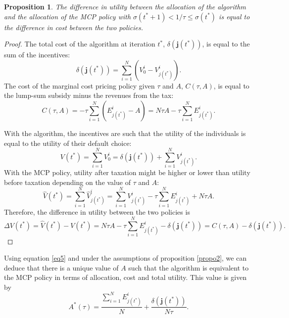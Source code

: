 \documentclass[empty, english]{javaudin}
\newtheorem{propo}{Proposition}
\begin{document}
\begin{propo}
	The difference in utility between the allocation of the algorithm and the allocation of the MCP policy with $\sigma(t^{*}+1) < 1 / \tau \leq \sigma(t^{*})$ is equal to the difference in cost between the two policies.
	\label{propo3}
\end{propo}

\begin{proof}
	
The total cost of the algorithm at iteration $t^{*}$, $\delta(\mathbf{j}(t^{*}))$, is equal to the sum of the incentives:
\begin{equation}
	\delta(\mathbf{j}(t^{*})) = \sum^{N}_{i=1} (V^i_0 - V^i_{j(t^{*})}).
\end{equation}
The cost of the marginal cost pricing policy given $\tau$ and $A$, $C(\tau, A)$, is equal to the lump-sum subsidy minus the revenues from the tax:
\begin{equation}
	C(\tau, A) = -\tau \sum^{N}_{i=1} (E^i_{j(t^{*})} - A) = N \tau A - \tau \sum^{N}_{i=1} E^i_{j(t^{*})}.
\end{equation}

With the algorithm, the incentives are such that the utility of the individuals is equal to the utility of their default choice:
\begin{equation}
	V(t^{*}) = \sum^{N}_{i=1} V_0^i = \delta(\mathbf{j}(t^{*})) + \sum^{N}_{i=1} V^i_{j(t^{*})}.
\end{equation}
With the MCP policy, utility after taxation might be higher or lower than utility before taxation depending on the value of $\tau$ and $A$:
\begin{equation}
	\hat{V}(t^{*}) = \sum^{N}_{i=1} \hat{V}_{j(t^{*})}^i = \sum^{N}_{i=1} V^i_{j(t^{*})} - \tau \sum^{N}_{i=1} E_{j(t^{*})}^i + N \tau A.
\end{equation}
Therefore, the difference in utility between the two policies is
\begin{equation}
	\Delta V(t^{*}) = \hat{V}(t^{*}) - V(t^{*}) = N \tau A - \tau \sum^{N}_{i=1} E^i_{j(t^{*})} - \delta(\mathbf{j}(t^{*})) = C(\tau, A) - \delta(\mathbf{j}(t^{*})).
	\label{eq5}
\end{equation}

\end{proof}

Using equation \eqref{eq5} and under the assumptions of proposition \ref{propo2}, we can deduce that there is a unique value of $A$ such that the algorithm is equivalent to the MCP policy in terms of allocation, cost and total utility. 
This value is given by
\begin{equation}
	A^{*}(\tau) = \frac{ \sum^{N}_{i=1} E^i_{j(t^{*})}}{N} + \frac{\delta(\mathbf{j}(t^{*}))}{N \tau} . 
\end{equation}
\end{document}
